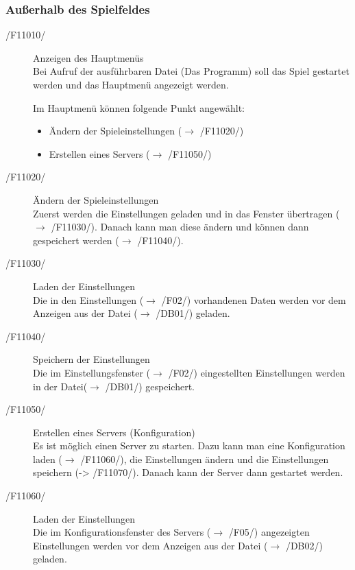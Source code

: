 \documentclass[a4paper,10pt]{article}
\begin{document}
\subsubsection{Außerhalb des Spielfeldes}
\begin{description}
\item[/F11010/] Anzeigen des Hauptmenüs \\
Bei Aufruf der ausführbaren Datei (Das Programm) soll das Spiel gestartet werden und das Hauptmenü angezeigt werden.

Im Hauptmenü können folgende Punkt angewählt:
\begin{itemize}
\item Ändern der Spieleinstellungen ($\rightarrow$ /F11020/)
\item Erstellen eines Servers ($\rightarrow$ /F11050/)
\end{itemize}

\item[/F11020/] Ändern der Spieleinstellungen \\
Zuerst werden die Einstellungen geladen und in das Fenster übertragen ($\rightarrow$ /F11030/). Danach kann man diese ändern und können dann gespeichert werden ($\rightarrow$ /F11040/).

\item[/F11030/] Laden der Einstellungen \\
Die in den Einstellungen ($\rightarrow$ /F02/) vorhandenen Daten werden vor dem Anzeigen aus der Datei ($\rightarrow$ /DB01/) geladen.

\item[/F11040/] Speichern der Einstellungen \\
Die im Einstellungsfenster ($\rightarrow$ /F02/) eingestellten Einstellungen werden in der Datei($\rightarrow$ /DB01/) gespeichert.

\item[/F11050/] Erstellen eines Servers (Konfiguration) \\
Es ist möglich einen Server zu starten. Dazu kann man eine Konfiguration laden ($\rightarrow$ /F11060/), die Einstellungen ändern und die Einstellungen speichern (-> /F11070/). Danach kann der Server dann gestartet werden.

\item[/F11060/] Laden der Einstellungen \\
Die im Konfigurationsfenster des Servers ($\rightarrow$ /F05/) angezeigten Einstellungen werden vor dem Anzeigen aus der Datei ($\rightarrow$ /DB02/) geladen.


\end{description}
\end{document}
